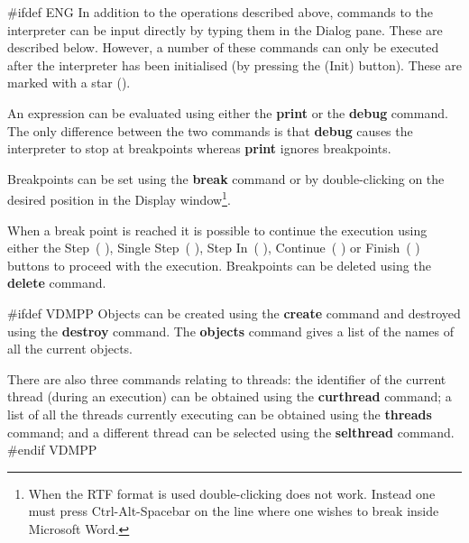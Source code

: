 \documentclass[\pformat,12pt]{article}
\newcommand{\guicmd}[1]{{\sf #1}}
\newcommand{\guicmd}[1]{{\gt #1}}
\begin{document}
#ifdef ENG
In addition to the operations described above, commands to the
interpreter can be input directly by typing them in the
\guicmd{Dialog} pane. These are described below. However, a number of
these commands can only be executed after the interpreter has
been initialised (by pressing the
(\guicmd{Init}) button).  These are
marked with a star ({\tt *}).

An expression can be evaluated using either the
\textbf{print} or the
\textbf{debug} command.  The only difference
between the two commands 
is that {\bf debug} causes the interpreter to stop at breakpoints
whereas {\bf print} ignores breakpoints.

Breakpoints can be set using the \textbf{break} command
 or by 
double-clicking on the desired position in the \guicmd{Display}
window\footnote{When the RTF format is used double-clicking does not
work. Instead one must press Ctrl-Alt-Spacebar on the line where one
wishes to break inside Microsoft Word.}.

When a break point is reached
it is possible to continue the execution using either the
\guicmd{Step}~(\hspace{-1.8mm}
),
\guicmd{Single Step}~(\hspace{-1.8mm} 
),
\guicmd{Step In}~(\hspace{-1.8mm}
),
\guicmd{Continue}~(\hspace{-1.8mm}
)
or \guicmd{Finish}~(\hspace{-1.8mm} 
)
buttons to proceed with the execution. Breakpoints can be deleted
using the \textbf{delete} command. 

#ifdef VDMPP
Objects can be created using the \textbf{create} command
 and destroyed
using the \textbf{destroy} command. The
\textbf{objects} command gives 
a list of the names of all the current objects.

There are also three commands relating to threads: the identifier of
the current thread (during an execution) can be obtained using the
\textbf{curthread} command; a list of all
the threads currently executing can be obtained using the
\textbf{threads} command; and a 
different thread can be selected using the \textbf{selthread}
command.
#endif VDMPP
\end{document}
